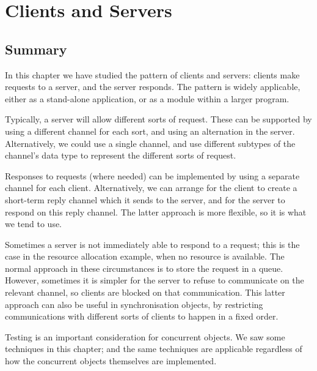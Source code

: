 \chapter{Clients and Servers}





\section{Summary}

In this chapter we have studied the pattern of clients and servers: clients
make requests to a server, and the server responds.  The pattern is widely
applicable, either as a stand-alone application, or as a module within a
larger program. 

Typically, a server will allow different sorts of request.  These can be
supported by using a different channel for each sort, and using an alternation
in the server.  Alternatively, we could use a single channel, and use
different subtypes of the channel's data type to represent the different sorts
of request. 

Responses to requests (where needed) can be implemented by using a separate
channel for each client.  Alternatively, we can arrange for the client to
create a short-term reply channel which it sends to the server, and for the
server to respond on this reply channel.  The latter approach is more
flexible, so it is what we tend to use.

Sometimes a server is not immediately able to respond to a request; this is
the case in the resource allocation example, when no resource is available.
The normal approach in these circumstances is to store the request in a queue.
However, sometimes it is simpler for the server to refuse to communicate on
the relevant channel, so clients are blocked on that communication.  This
latter approach can also be useful in synchronisation objects, by restricting
communications with different sorts of clients to happen in a fixed order. 

Testing is an important consideration for concurrent objects.  We saw some
techniques in this chapter; and the same techniques are applicable regardless
of how the concurrent objects themselves are implemented.

